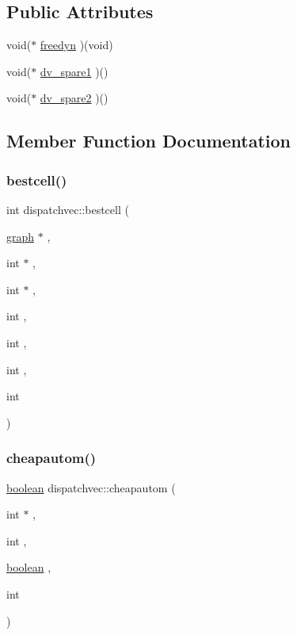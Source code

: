 \subsection*{Public Attributes}
\begin{DoxyCompactItemize}
\item 
void($\ast$ \mbox{\hyperlink{structdispatchvec_a502d86b75d2ac79d874be8082e7573a8}{freedyn}} )(void)
\item 
void($\ast$ \mbox{\hyperlink{structdispatchvec_af3df5d60389cfbac3eaa7b03eed08a4f}{dv\+\_\+spare1}} )()
\item 
void($\ast$ \mbox{\hyperlink{structdispatchvec_af71dcfcbcdfecb8026359a028ba3e49a}{dv\+\_\+spare2}} )()
\end{DoxyCompactItemize}


\subsection{Member Function Documentation}
\mbox{\label{structdispatchvec_a45a9bfbd9e3b9bba71f55448c8775cd5}} 
\subsubsection{\texorpdfstring{bestcell()}{bestcell()}}
{\footnotesize\ttfamily int dispatchvec\+::bestcell (\begin{DoxyParamCaption}\item[{\mbox{\hyperlink{nauty_8h_a28c08db7c5948ab173e0f0497773f2f1}{graph}} $\ast$}]{,  }\item[{int $\ast$}]{,  }\item[{int $\ast$}]{,  }\item[{int}]{,  }\item[{int}]{,  }\item[{int}]{,  }\item[{int}]{ }\end{DoxyParamCaption})}

\mbox{\label{structdispatchvec_adc5ae3eaf016e75aaf9fd241c4601f42}} 
\subsubsection{\texorpdfstring{cheapautom()}{cheapautom()}}
{\footnotesize\ttfamily \mbox{\hyperlink{nauty_8h_a621c38f1f10a1c565d897e3178b16d6e}{boolean}} dispatchvec\+::cheapautom (\begin{DoxyParamCaption}\item[{int $\ast$}]{,  }\item[{int}]{,  }\item[{\mbox{\hyperlink{nauty_8h_a621c38f1f10a1c565d897e3178b16d6e}{boolean}}}]{,  }\item[{int}]{ }\end{DoxyParamCaption})}

